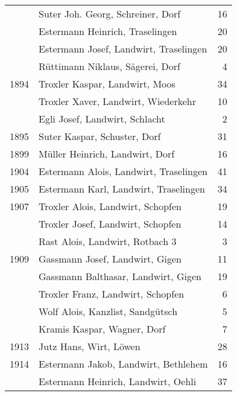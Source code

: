 {\begin{longtable}{ l l r }
                      & Suter Joh. Georg, Schreiner, Dorf         & 16          \\
                      & Estermann Heinrich, Traselingen           & 20          \\
                      & Estermann Josef, Landwirt, Traselingen    & 20          \\
                      & Rüttimann Niklaus, Sägerei, Dorf          & 4           \\
        1894          & Troxler Kaspar, Landwirt, Moos            & 34          \\
                      & Troxler Xaver, Landwirt, Wiederkehr       & 10          \\
                      & Egli Josef, Landwirt, Schlacht            & 2           \\
        1895          & Suter Kaspar, Schuster, Dorf              & 31          \\
        1899          & Müller Heinrich, Landwirt, Dorf           & 16          \\
        1904          & Estermann Alois, Landwirt, Traselingen    & 41          \\
        1905          & Estermann Karl, Landwirt, Traselingen     & 34          \\
        1907          & Troxler Alois, Landwirt, Schopfen         & 19          \\
                      & Troxler Josef, Landwirt, Schopfen         & 14          \\
                      & Rast Alois, Landwirt, Rotbach 3           & 3           \\
        1909          & Gassmann Josef, Landwirt, Gigen           & 11          \\
                      & Gassmann Balthasar, Landwirt, Gigen       & 19          \\
                      & Troxler Franz, Landwirt, Schopfen         & 6           \\
                      & Wolf Alois, Kanzlist, Sandgütsch          & 5           \\
                      & Kramis Kaspar, Wagner, Dorf               & 7           \\
        1913          & Jutz Hans, Wirt, Löwen                    & 28          \\
        1914          & Estermann Jakob, Landwirt, Bethlehem      & 16          \\
                      & Estermann Heinrich, Landwirt, Oehli       & 37          \\

\end{longtable}}
